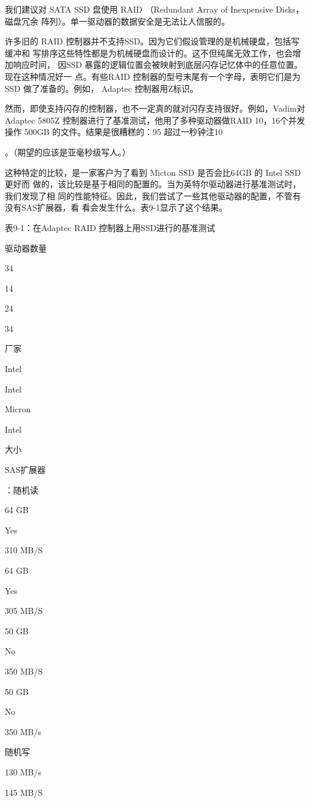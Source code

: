 我们建议对 SATA SSD 盘使用 RAID （Redundant Array of Inexpensive Disks，磁盘冗余
阵列）。单一驱动器的数据安全是无法让人信服的。

许多旧的 RAID 控制器并不支持SSD。因为它们假设管理的是机械硬盘，包括写缓冲和
写排序这些特性都是为机械硬盘而设计的。这不但纯属无效工作，也会增加响应时间，
因SSD 暴露的逻辑位置会被映射到底层闪存记忆体中的任意位置。现在这种情况好一
点。有些RAID 控制器的型号末尾有一个字母，表明它们是为SSD 做了准备的。例如，
Adaptec 控制器用Z标识。

然而，即使支持闪存的控制器，也不一定真的就对闪存支持很好。例如，Vadim对
Adaptec 5805Z 控制器进行了基准测试，他用了多种驱动器做RAID 10，16个并发操作
500GB 的文件。结果是很糟糕的：95%
超过一秒钟注10

。（期望的应该是亚毫秒级写人。）

这种特定的比较，是一家客户为了看到 Micton SSD 是否会比64GB 的 Intel SSD 更好而
做的，该比较是基于相同的配置的。当为英特尔驱动器进行基准测试时，我们发现了相
同的性能特征。因此，我们尝试了一些其他驱动器的配置，不管有没有SAS扩展器，看
看会发生什么。表9-1显示了这个结果。

表9-1：在Adaptec RAID 控制器上用SSD进行的基准测试

驱动器数量

34

14

24

34

厂家

Intel

Intel

Micron

Intel

大小

SAS扩展器

：随机读

64 GB

Yes

310 MB/S

64 GB

Yes

305 MB/S

50 GB

No

350 MB/S

50 GB

No

350 MB/s

随机写

130 MB/s

145 MB/S

